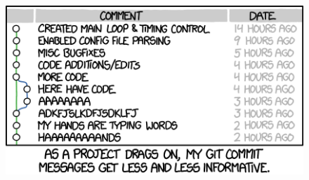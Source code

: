 \documentclass{beamer}
\begin{document}
\begin{frame}
    \begin{figure}
        \includegraphics[height=.4\textheight]{git_commit}
        \label{fig:xkcd-git-commit}
    \end{figure}
\end{frame}
\end{document}
